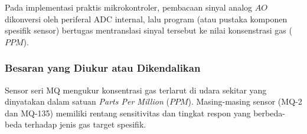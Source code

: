 Pada implementasi praktis mikrokontroler, pembacaan sinyal analog $AO$ dikonversi oleh periferal ADC internal, lalu program (atau pustaka komponen spesifik sensor) bertugas mentranslasi sinyal tersebut ke nilai konsenstrasi gas ($PPM$).

\subsubsection{Besaran yang Diukur atau Dikendalikan}
Sensor seri MQ mengukur konsentrasi gas terlarut di udara sekitar yang dinyatakan dalam satuan \textit{Parts Per Million} ($PPM$). Masing-masing sensor (MQ-2 dan MQ-135) memiliki rentang sensitivitas dan tingkat respon yang berbeda-beda terhadap jenis gas target spesifik.

